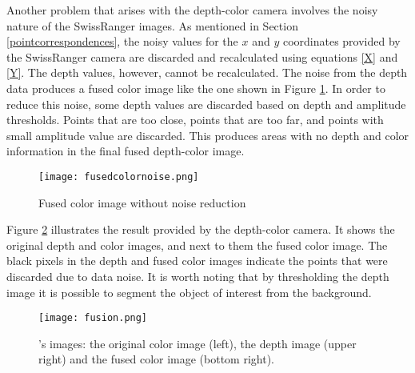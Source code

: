 Another problem that arises with the depth-color camera involves the noisy nature of the SwissRanger
images. As mentioned in Section \ref{pointcorrespondences}, the noisy values for the $x$ and $y$ 
coordinates provided by the SwissRanger camera are discarded and recalculated using equations \eqref{X} 
and \eqref{Y}. The depth values, however, cannot be recalculated. The noise from the depth data produces 
a fused color image like the one shown in Figure \ref{noise}. In order to reduce this noise, some depth 
values are discarded based on depth and amplitude thresholds. Points that are too close, points that are too 
far, and points with small amplitude value are discarded. This produces areas with no depth and color 
information in the final fused depth-color image. 

\begin{figure}[t]
\center
\texttt{[image: fusedcolornoise.png]}
\caption{Fused color image without noise reduction}
\label{noise}
\end{figure}

Figure \ref{fusion} illustrates the result provided by the depth-color camera. It shows the original depth 
and color images, and next to them the fused color image. The black pixels in the depth and fused color
images indicate the points that were discarded due to data noise. It is worth noting that by thresholding the 
depth image it is possible to segment the object of interest from the background. 

\begin{figure}[t]
\center
\texttt{[image: fusion.png]}
\caption[\DepthColorCam{}'s images]{\DepthColorCam{}'s images: the original color image (left), the 
depth image (upper right) and the fused color image (bottom right).}
\label{fusion}
\end{figure}


